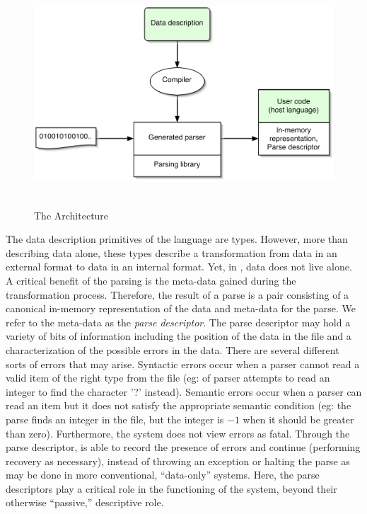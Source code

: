 \documentclass{entcs}
\begin{document}
\begin{figure}[tp]
  \includegraphics[height=3in,width=5in]{architecture.eps}
\label{fig:pads-arch}
\caption{The \pads{} Architecture}
\end{figure}

The data description primitives of the \pads{} language are types.
However, more than describing data alone, these types describe a
transformation from data in an external format to data in an internal
format.  Yet, in \pads{}, data does not live alone. A critical benefit
of the parsing is the meta-data gained during the transformation
process.  Therefore, the result of a parse is a pair consisting of a
canonical in-memory representation of the data and meta-data for the
parse.  We refer to the meta-data as the {\em parse descriptor}. The
parse descriptor may hold a variety of bits of information including
the position of the data in the file and a characterization of the
possible errors in the data.  There are several different sorts of
errors that may arise.  Syntactic errors occur when a parser cannot
read a valid item of the right type from the file (eg: of parser
attempts to read an integer to find the character '?'  instead).
Semantic errors occur when a parser can read an item but it does not
satisfy the appropriate semantic condition (eg: the parse finds an
integer in the file, but the integer is $-1$ when it should be greater
than zero).  Furthermore, the \pads{} system does not view errors as
fatal. Through the parse descriptor, \pads{} is able to record the
presence of errors and continue (performing recovery as necessary),
instead of throwing an exception or halting the parse as may be done
in more conventional, ``data-only'' systems. Here, the parse
descriptors play a critical role in the functioning of the system,
beyond their otherwise ``passive,'' descriptive role.
\end{document}
